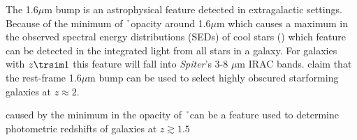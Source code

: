 The 1.6$\mu$m bump is an astrophysical feature detected in extragalactic settings.  Because of the minimum of \h\ opacity around 1.6$\mu$m which causes a maximum in the observed spectral energy distributions (SEDs) of cool stars (\citealt{sawicki2002}) which feature can be detected in the integrated light from all stars in a galaxy.  For galaxies with $z\trsim1$ this feature will fall into {\it Spiter}'s 3-8 $\mu$m IRAC bands.  \cite{desai2009} claim that the rest-frame 1.6$\mu$m bump can be used to select highly obscured starforming galaxies at $z\approx 2$.  %

caused by the minimum in the opacity of \h\ can be a feature used to determine photometric redshifts of galaxies at $z\gtrsim1.5$
